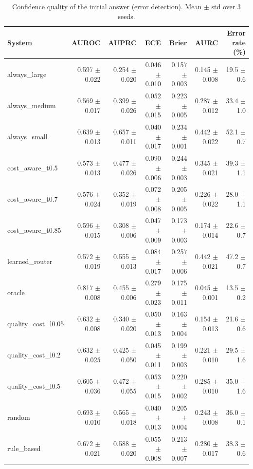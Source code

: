 \begin{table}[t]
\centering
\small
\caption{Confidence quality of the initial answer (error detection). Mean $\pm$ std over 3 seeds.}
\label{tab:calibration}
\begin{tabular}{lrrrrrr}
\toprule
System & AUROC & AUPRC & ECE & Brier & AURC & Error rate (\%) \\
\midrule
always\_large & 0.597 $\pm$ 0.022 & 0.254 $\pm$ 0.020 & 0.046 $\pm$ 0.010 & 0.157 $\pm$ 0.003 & 0.145 $\pm$ 0.008 & 19.5 $\pm$ 0.6 \\
always\_medium & 0.569 $\pm$ 0.017 & 0.399 $\pm$ 0.026 & 0.052 $\pm$ 0.015 & 0.223 $\pm$ 0.005 & 0.287 $\pm$ 0.012 & 33.4 $\pm$ 1.0 \\
always\_small & 0.639 $\pm$ 0.013 & 0.657 $\pm$ 0.011 & 0.040 $\pm$ 0.017 & 0.234 $\pm$ 0.001 & 0.442 $\pm$ 0.022 & 52.1 $\pm$ 0.7 \\
cost\_aware\_t0.5 & 0.573 $\pm$ 0.013 & 0.477 $\pm$ 0.026 & 0.090 $\pm$ 0.006 & 0.244 $\pm$ 0.003 & 0.345 $\pm$ 0.021 & 39.3 $\pm$ 1.1 \\
cost\_aware\_t0.7 & 0.576 $\pm$ 0.024 & 0.352 $\pm$ 0.019 & 0.072 $\pm$ 0.008 & 0.205 $\pm$ 0.005 & 0.226 $\pm$ 0.022 & 28.0 $\pm$ 1.1 \\
cost\_aware\_t0.85 & 0.596 $\pm$ 0.015 & 0.308 $\pm$ 0.006 & 0.047 $\pm$ 0.009 & 0.173 $\pm$ 0.003 & 0.174 $\pm$ 0.014 & 22.6 $\pm$ 0.7 \\
learned\_router & 0.572 $\pm$ 0.019 & 0.555 $\pm$ 0.013 & 0.084 $\pm$ 0.017 & 0.257 $\pm$ 0.006 & 0.442 $\pm$ 0.021 & 47.2 $\pm$ 0.7 \\
oracle & 0.817 $\pm$ 0.008 & 0.455 $\pm$ 0.006 & 0.279 $\pm$ 0.023 & 0.175 $\pm$ 0.011 & 0.045 $\pm$ 0.001 & 13.5 $\pm$ 0.2 \\
quality\_cost\_l0.05 & 0.632 $\pm$ 0.008 & 0.340 $\pm$ 0.020 & 0.050 $\pm$ 0.013 & 0.163 $\pm$ 0.004 & 0.154 $\pm$ 0.013 & 21.6 $\pm$ 0.6 \\
quality\_cost\_l0.2 & 0.632 $\pm$ 0.025 & 0.425 $\pm$ 0.050 & 0.045 $\pm$ 0.011 & 0.199 $\pm$ 0.003 & 0.221 $\pm$ 0.010 & 29.5 $\pm$ 1.6 \\
quality\_cost\_l0.5 & 0.605 $\pm$ 0.036 & 0.472 $\pm$ 0.055 & 0.053 $\pm$ 0.015 & 0.220 $\pm$ 0.002 & 0.285 $\pm$ 0.010 & 35.0 $\pm$ 1.6 \\
random & 0.693 $\pm$ 0.010 & 0.565 $\pm$ 0.018 & 0.040 $\pm$ 0.013 & 0.205 $\pm$ 0.004 & 0.243 $\pm$ 0.008 & 36.0 $\pm$ 0.1 \\
rule\_based & 0.672 $\pm$ 0.021 & 0.588 $\pm$ 0.020 & 0.055 $\pm$ 0.008 & 0.213 $\pm$ 0.007 & 0.280 $\pm$ 0.017 & 38.3 $\pm$ 0.6 \\

\end{tabular}
\end{table}
